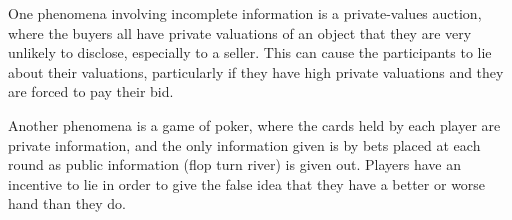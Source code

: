 \documentclass[12pt]{paper}
\begin{document}
One phenomena involving incomplete information is a private-values auction,
where the buyers all have private valuations of an object that they are very
unlikely to disclose, especially to a seller. This can cause the participants to
lie about their valuations, particularly if they have high private valuations
and they are forced to pay their bid.

Another phenomena is a game of poker, where the cards held by each player are
private information, and the only information given is by bets placed at each
round as public information (flop turn river) is given out. Players have an
incentive to lie in order to give the false idea that they have a better or
worse hand than they do.
\end{document}

